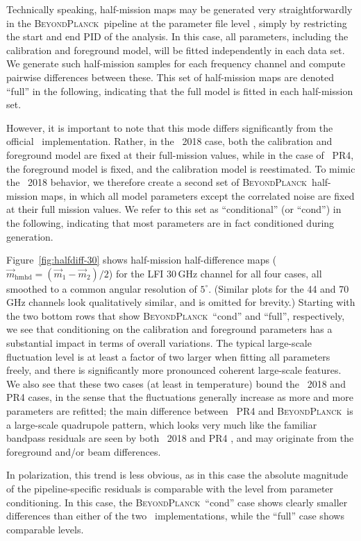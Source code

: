 \documentclass[twocolumn]{aa}
\newcommand{\m}[0]{\vec{m}}
\newcommand{\BP}{\textsc{BeyondPlanck}}
\begin{document}
Technically speaking, half-mission maps may be generated very
straightforwardly in the \BP\ pipeline at the parameter file level
\citep{bp03}, simply by restricting the start and end PID of the
analysis. In this case, all parameters, including the calibration and
foreground model, will be fitted independently in each data set. We
generate such half-mission samples for each frequency channel and
compute pairwise differences between these. This set of half-mission
maps are denoted ``full'' in the following, indicating that the full
model is fitted in each half-mission set.

However, it is important to note that this mode differs significantly
from the official \Planck\ implementation. Rather, in the
\Planck\ 2018 case, both the calibration and foreground model are
fixed at their full-mission values, while in the case of \Planck\ PR4,
the foreground model is fixed, and the calibration model is
reestimated. To mimic the \Planck\ 2018 behavior, we therefore
create a second set of \BP\ half-mission maps, in which all model
parameters except the correlated noise are fixed at their full mission
values. We refer to this set as ``conditional'' (or ``cond'') in the
following, indicating that most parameters are in fact conditioned
during generation.

Figure~\ref{fig:halfdiff-30} shows half-mission half-difference maps
($\m_{\mathrm{hmhd}} = (\m_{1}-\m_2)/2$) for the LFI 30\,GHz channel
for all four cases, all smoothed to a common angular resolution of
$5^{\circ}$. (Similar plots for the 44 and 70\,GHz channels look
qualitatively similar, and is omitted for brevity.) Starting with the
two bottom rows that show \BP\ ``cond'' and ``full'', respectively, we
see that conditioning on the calibration and foreground parameters
has a substantial impact in terms of overall variations. The typical
large-scale fluctuation level is at least a factor of two larger when
fitting all parameters freely, and there is significantly more
pronounced coherent large-scale features. We also see that these two
cases (at least in temperature) bound the \Planck\ 2018 and PR4 cases,
in the sense that the fluctuations generally increase as more and more
parameters are refitted; the main difference between \Planck\ PR4 and
\BP\ is a large-scale quadrupole pattern, which looks very much like
the familiar bandpass residuals are seen by both \Planck\ 2018 and PR4
\citep{npipe}, and may originate from the foreground and/or beam
differences.

In polarization, this trend is less obvious, as in this case the
absolute magnitude of the pipeline-specific residuals is comparable
with the level from parameter conditioning. In this case, the
\BP\ ``cond'' case shows clearly smaller differences than either of the
two \Planck\ implementations, while the ``full'' case shows comparable
levels. 
\end{document}
